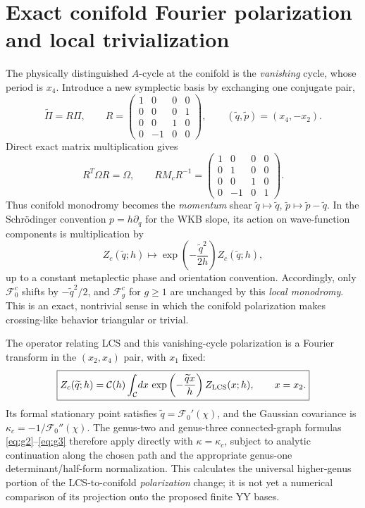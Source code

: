 \documentclass[11pt,letterpaper]{article}
\begin{document}
\section{Exact conifold Fourier polarization and local trivialization}
The physically distinguished $A$-cycle at the conifold is the \emph{vanishing} cycle, whose period is $x_4$. Introduce a new symplectic basis by exchanging one conjugate pair,
\begin{equation}
\widetilde\Pi=R\Pi,\qquad
R=\begin{pmatrix}1&0&0&0\\0&0&0&1\\0&0&1&0\\0&-1&0&0\end{pmatrix},\qquad
(\widetilde q,\widetilde p)=(x_4,-x_2).
\end{equation}
Direct exact matrix multiplication gives
\begin{equation}
R^T\Omega R=\Omega,\qquad
\boxed{RM_cR^{-1}=\begin{pmatrix}1&0&0&0\\0&1&0&0\\0&0&1&0\\0&-1&0&1\end{pmatrix}.}
\end{equation}
Thus conifold monodromy becomes the \emph{momentum} shear $\widetilde q\mapsto\widetilde q$, $\widetilde p\mapsto\widetilde p-\widetilde q$. In the Schr\"odinger convention $p=h\partial_q$ for the WKB slope, its action on wave-function components is multiplication by
\begin{equation}
\boxed{Z_c(\widetilde q;h)\longmapsto
\exp\!\left(-\frac{\widetilde q^2}{2h}\right) Z_c(\widetilde q;h),}
\end{equation}
up to a constant metaplectic phase and orientation convention. Accordingly, only $\mathcal F_0^c$ shifts by $-\widetilde q^2/2$, and $\mathcal F_g^c$ for $g\geq1$ are unchanged by this \emph{local monodromy}. This is an exact, nontrivial sense in which the conifold polarization makes crossing-like behavior triangular or trivial.

The operator relating LCS and this vanishing-cycle polarization is a Fourier transform in the $(x_2,x_4)$ pair, with $x_1$ fixed:
\begin{equation}\boxed{
Z_c(\widetilde q;h)=\mathcal C(h)\int_{\mathcal C}\!dx\,
\exp\left(-\frac{\widetilde q x}{h}\right)
Z_{\rm LCS}(x;h),\qquad x=x_2.}
\end{equation}
Its formal stationary point satisfies $\widetilde q=\mathcal F_0'(\chi)$, and the Gaussian covariance is $\kappa_c=-1/\mathcal F_0''(\chi)$. The genus-two and genus-three connected-graph formulas \eqref{eq:g2}--\eqref{eq:g3} therefore apply directly with $\kappa=\kappa_c$, subject to analytic continuation along the chosen path and the appropriate genus-one determinant/half-form normalization. This calculates the universal higher-genus portion of the LCS-to-conifold \emph{polarization} change; it is not yet a numerical comparison of its projection onto the proposed finite YY bases.
\end{document}
